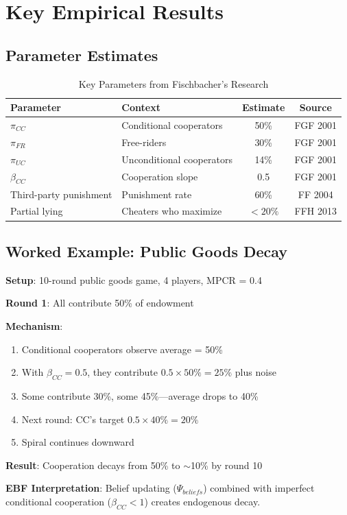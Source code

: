 \section{Key Empirical Results}

\subsection{Parameter Estimates}

\begin{table}[h]
\centering
\caption{Key Parameters from Fischbacher's Research}
\label{tab:fischbacher-parameters}
\begin{tabular}{llcc}
\toprule
\textbf{Parameter} & \textbf{Context} & \textbf{Estimate} & \textbf{Source} \\
\midrule
$\pi_{CC}$ & Conditional cooperators & 50\% & FGF 2001 \\
$\pi_{FR}$ & Free-riders & 30\% & FGF 2001 \\
$\pi_{UC}$ & Unconditional cooperators & 14\% & FGF 2001 \\
$\beta_{CC}$ & Cooperation slope & 0.5 & FGF 2001 \\
Third-party punishment & Punishment rate & 60\% & FF 2004 \\
Partial lying & Cheaters who maximize & $< 20\%$ & FFH 2013 \\
\bottomrule
\end{tabular}
\end{table}

\subsection{Worked Example: Public Goods Decay}

\begin{tcolorbox}[colback=green!5!white,colframe=green!75!black,title=Worked Example: Why Cooperation Decays]
\textbf{Setup}: 10-round public goods game, 4 players, MPCR = 0.4

\textbf{Round 1}: All contribute 50\% of endowment

\textbf{Mechanism}:
\begin{enumerate}
    \item Conditional cooperators observe average = 50\%
    \item With $\beta_{CC} = 0.5$, they contribute $0.5 \times 50\% = 25\%$ plus noise
    \item Some contribute 30\%, some 45\%---average drops to 40\%
    \item Next round: CC's target $0.5 \times 40\% = 20\%$
    \item Spiral continues downward
\end{enumerate}

\textbf{Result}: Cooperation decays from 50\% to $\sim$10\% by round 10

\textbf{EBF Interpretation}: Belief updating ($\Psi_{beliefs}$) combined with imperfect conditional cooperation ($\beta_{CC} < 1$) creates endogenous decay.
\end{tcolorbox}

